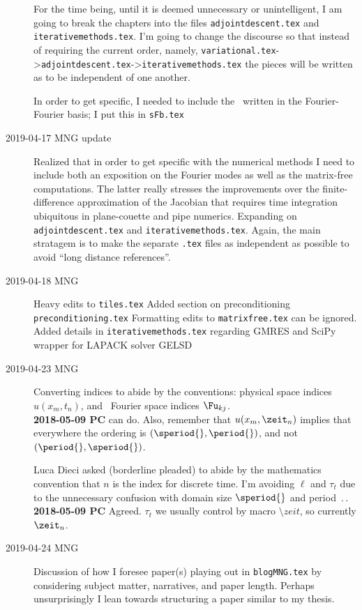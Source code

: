\begin{description}
For the time being, until it is deemed unnecessary or unintelligent, I am going
to break the chapters into the files \texttt{adjointdescent.tex} and \texttt{iterativemethods.tex}.
I'm going to change the discourse so that instead of requiring the current order,
namely, \texttt{variational.tex}->\texttt{adjointdescent.tex}->\texttt{iterativemethods.tex}
the pieces will be written as to be independent of one another.

In order to get specific, I needed to include the \KSe\ written in the Fourier-Fourier basis; I put this in \texttt{sFb.tex}

\item[2019-04-17 MNG update]
Realized that in order to get specific with the numerical methods I need to
include both an exposition on the {\spt} Fourier modes  as well
as the matrix-free computations. The latter really stresses the improvements
over the finite-difference approximation of the Jacobian that requires
time integration ubiquitous in plane-couette and pipe numerics.
Expanding on \texttt{adjointdescent.tex} and \texttt{iterativemethods.tex}.
Again, the main stratagem is to make the separate \texttt{.tex} files
as independent as possible to avoid ``long distance references''.

\item[2019-04-18 MNG]
Heavy edits to \texttt{tiles.tex}
Added section on preconditioning \texttt{preconditioning.tex}
Formatting edits to \texttt{matrixfree.tex} can be ignored.
\\
Added details in \texttt{iterativemethods.tex} regarding GMRES
and SciPy wrapper for LAPACK solver GELSD

\item[2019-04-23 MNG]
Converting indices to abide by the conventions: physical space
indices $u(x_m,t_n)$, and \spt\ Fourier space indices
$\Fu_{kj}$.
\\{\bf 2018-05-09 PC} can do. Also, remember that
$u(x_m,\zeit_n)$ implies that everywhere the ordering is
$(\speriod{},\period{})$, and not $(\period{},\speriod{})$.

Luca Dieci asked (borderline pleaded) to abide by the
mathematics convention that $n$ is the index for discrete
time. I'm avoiding $\ell$ and $\tau_t$ due to the unnecessary
confusion with domain size $\speriod{}$ and period $\period{}$.
\\{\bf 2018-05-09 PC} Agreed. $\tau_t$ we usually control by macro
$\setminus zeit$, so currently
$\zeit_n$.

\item[2019-04-24 MNG]
Discussion of how I foresee paper(s) playing out in \texttt{blogMNG.tex}
by considering subject matter, narratives, and paper length.
Perhaps unsurprisingly I lean towards structuring a paper similar
to my thesis.


\end{description}
